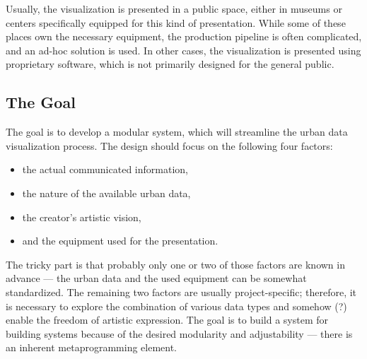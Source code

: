 Usually, the visualization is presented in a public space, either in museums or centers specifically equipped for this kind of presentation. While some of these places own the necessary equipment, the production pipeline is often complicated, and an ad-hoc solution is used. In other cases, the visualization is presented using proprietary software, which is not primarily designed for the general public.

\subsection{The Goal}

The goal is to develop a modular system, which will streamline the urban data visualization process. The design should focus on the following four factors:
\begin{itemize}
    \item the actual communicated information,
    \item the nature of the available urban data,
    \item the creator's artistic vision,
    \item and the equipment used for the presentation.
\end{itemize}
The tricky part is that probably only one or two of those factors are known in advance --- the urban data and the used equipment can be somewhat standardized. The remaining two factors are usually project-specific; therefore, it is necessary to explore the combination of various data types and somehow (?) enable the freedom of artistic expression. The goal is to build a system for building systems because of the desired modularity and adjustability --- there is an inherent metaprogramming element.